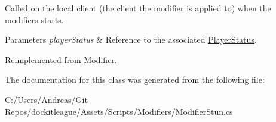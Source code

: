 Called on the local client (the client the modifier is applied to) when the modifiers starts. 


\begin{DoxyParams}{Parameters}
{\em player\+Status} & Reference to the associated \hyperlink{class_player_status}{Player\+Status}.\\
\hline
\end{DoxyParams}


Reimplemented from \hyperlink{class_modifier_a5cce7ec6a5a595265a6bf5a6f7e40eb9}{Modifier}.



The documentation for this class was generated from the following file\+:\begin{DoxyCompactItemize}
\item 
C\+:/\+Users/\+Andreas/\+Git Repos/dockitleague/\+Assets/\+Scripts/\+Modifiers/Modifier\+Stun.\+cs\end{DoxyCompactItemize}
